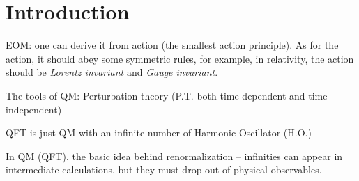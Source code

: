 \section{Introduction}

EOM: one can derive it from action (the smallest action principle). As for the
action, it should abey some symmetric rules, for example, in relativity, the 
action should be \emph{Lorentz invariant} and \emph{Gauge invariant}. 

The tools of QM: Perturbation theory (P.T. both time-dependent and time-independent)

QFT is just QM with an infinite number of Harmonic Oscillator (H.O.)

In QM (QFT), the basic idea behind renormalization -- infinities can appear in intermediate
calculations, but they must drop out of physical observables.

